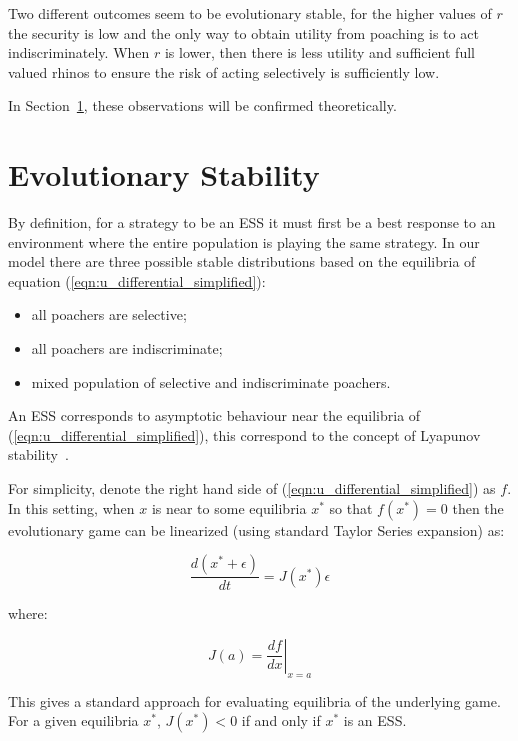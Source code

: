 \documentclass[10pt]{article}
\begin{document}
Two different outcomes seem to be evolutionary stable, for the higher values
of \(r\) the security is low and the only way to obtain utility from poaching is
to act indiscriminately. When \(r\) is lower, then there is less utility and
sufficient full valued rhinos to ensure the risk of acting selectively is
sufficiently low.

In Section~\ref{section:evolutionary_stability}, these observations will be
confirmed theoretically.

\section{Evolutionary Stability}\label{section:evolutionary_stability}

By definition, for a strategy to be an ESS it must first be a best response to an
environment where the entire population is playing the same strategy.
In our model there are three possible stable distributions based on the
equilibria of equation (\ref{eqn:u_differential_simplified}):

\begin{itemize}
    \item all poachers are selective;
    \item all poachers are indiscriminate;
    \item mixed population of selective and indiscriminate poachers.
\end{itemize}

An ESS corresponds to asymptotic behaviour near the equilibria of
(\ref{eqn:u_differential_simplified}), this correspond to the concept of
Lyapunov stability~\cite{lyapunov1992general}.

For simplicity, denote the right hand side of
(\ref{eqn:u_differential_simplified}) as \(f\).
In this setting, when \(x\) is near to some equilibria \(x^*\) so that
\(f(x^*)=0\) then the evolutionary game can be linearized (using standard Taylor
Series expansion) as:

\begin{equation}
    \frac{d(x^* + \epsilon)}{dt} = J(x^*)\epsilon
\end{equation}

where:

\begin{equation}
    J(a) = \left.\frac{df}{dx}\right|_{x=a}
\end{equation}

This gives a standard approach for evaluating equilibria of the underlying game.
For a given equilibria \(x^*\), \(J(x^*)<0\) if and only if \(x^*\) is an ESS\@.
\end{document}
